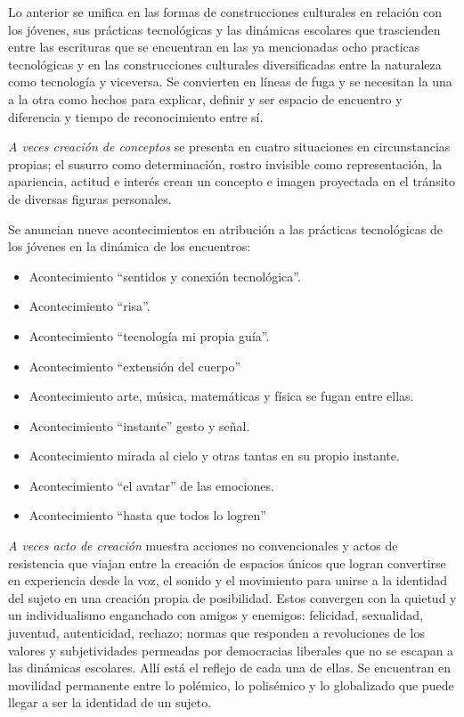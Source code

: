 \documentclass[spanish]{textolivre}
\begin{document}
Lo anterior se unifica en las formas de construcciones culturales en relación con los jóvenes, sus prácticas tecnológicas y las dinámicas escolares que trascienden entre las escrituras que se encuentran en las ya mencionadas ocho practicas tecnológicas y en las construcciones culturales diversificadas entre la naturaleza como tecnología y viceversa. Se convierten en líneas de fuga y se necesitan la una a la otra como hechos para explicar, definir y ser espacio de encuentro y diferencia y tiempo de reconocimiento entre sí.

\textit{A veces creación de conceptos} se presenta en cuatro situaciones en circunstancias propias; el susurro como determinación, rostro invisible como representación, la apariencia, actitud e interés crean un concepto e imagen proyectada en el tránsito de diversas figuras personales.

Se anuncian nueve acontecimientos en atribución a las prácticas tecnológicas de los jóvenes en la dinámica de los encuentros:

\begin{itemize}
    \item Acontecimiento “sentidos y conexión tecnológica”.
    \item Acontecimiento “risa”.
    \item Acontecimiento “tecnología mi propia guía”.
    \item Acontecimiento “extensión del cuerpo”
    \item Acontecimiento arte, música, matemáticas y física se fugan entre ellas.
    \item Acontecimiento “instante” gesto y señal.	
    \item Acontecimiento mirada al cielo y otras tantas en su propio instante.
    \item Acontecimiento “el avatar” de las emociones.
    \item Acontecimiento “hasta que todos lo logren”
\end{itemize}

\textit{A veces acto de creación} muestra acciones no convencionales y actos de resistencia que viajan entre la creación de espacios únicos que logran convertirse en experiencia desde la voz, el sonido y el movimiento para unirse a la identidad del sujeto en una creación propia de posibilidad. Estos convergen con la quietud y un individualismo enganchado con amigos y enemigos: felicidad, sexualidad, juventud, autenticidad, rechazo; normas que responden a revoluciones de los valores y subjetividades permeadas por democracias liberales que no se escapan a las dinámicas escolares. Allí está el reflejo de cada una de ellas. Se encuentran en movilidad permanente entre lo polémico, lo polisémico y lo globalizado que puede llegar a ser la identidad de un sujeto.
\end{document}
